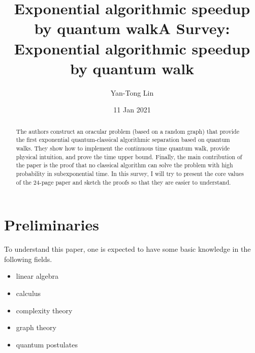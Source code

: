 \documentclass[aps,11pt,twoside,nofootinbib,tightenlines,superscriptaddress,preprintnumbers]{revtex4}
\title{Exponential algorithmic speedup by quantum walk}
\newcommand{\<}{\langle}
\renewcommand{\>}{\rangle}
\newenvironment{proof sketch}
{\trivlist\item\noindent{\bf Proof sketch}~}
{\qed\endtrivlist}
\begin{document}
\title{A Survey: Exponential algorithmic speedup by quantum walk}

\author{Yan-Tong Lin}

\date[]{11 Jan 2021}



\begin{abstract}
The authors construct an oracular problem (based on a random graph) that provide the first exponential quantum-classical algorithmic separation based on quantum walks. They show how to implement the continuous time quantum walk, provide physical intuition, and prove the time upper bound. Finally, the main contribution of the paper is the proof that no classical algorithm can solve the problem with high probability in subexponential time. In this survey, I will try to present the core values of the 24-page paper and sketch the proofs so that they are easier to understand.
\end{abstract}

\maketitle


\section{Preliminaries} \label{sec:pre}
To understand this paper, one is expected to have some basic knowledge in the following fields.
\begin{itemize}
    \item linear algebra
    \item calculus
    \item complexity theory
    \item graph theory
    \item quantum postulates
\end{itemize}{}
\end{document}
